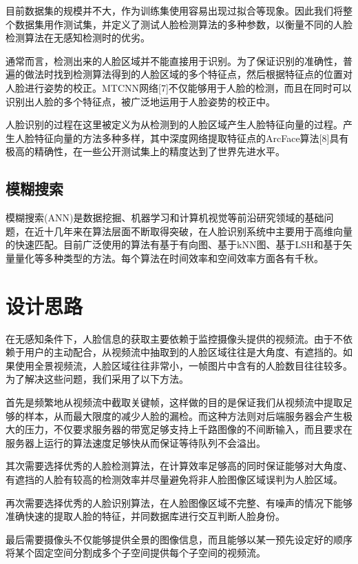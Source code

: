 目前数据集的规模并不大，作为训练集使用容易出现过拟合等现象。因此我们将整个数据集用作测试集，并定义了测试人脸检测算法的多种参数，以衡量不同的人脸检测算法在无感知检测时的优劣。

通常而言，检测出来的人脸区域并不能直接用于识别。为了保证识别的准确性，普遍的做法时找到检测算法得到的人脸区域的多个特征点，然后根据特征点的位置对人脸进行姿势的校正。MTCNN网络[7]不仅能够用于人脸的检测，而且在同时可以识别出人脸的多个特征点，被广泛地运用于人脸姿势的校正中。

人脸识别的过程在这里被定义为从检测到的人脸区域产生人脸特征向量的过程。产生人脸特征向量的方法多种多样，其中深度网络提取特征点的ArcFace算法[8]具有极高的精确性，在一些公开测试集上的精度达到了世界先进水平。

\subsection{模糊搜索}

模糊搜索(ANN)是数据挖掘、机器学习和计算机视觉等前沿研究领域的基础问题，在近十几年来在算法层面不断取得突破，在人脸识别系统中主要用于高维向量的快速匹配。目前广泛使用的算法有基于有向图、基于kNN图、基于LSH和基于矢量量化等多种类型的方法。每个算法在时间效率和空间效率方面各有千秋。

\section{设计思路}

在无感知条件下，人脸信息的获取主要依赖于监控摄像头提供的视频流。由于不依赖于用户的主动配合，从视频流中抽取到的人脸区域往往是大角度、有遮挡的。如果使用全景视频流，人脸区域往往非常小，一帧图片中含有的人脸数目往往较多。为了解决这些问题，我们采用了以下方法。

首先是频繁地从视频流中截取关键帧，这样做的目的是保证我们从视频流中提取足够的样本，从而最大限度的减少人脸的漏检。而这种方法则对后端服务器会产生极大的压力，不仅要求服务器的带宽足够支持上千路图像的不间断输入，而且要求在服务器上运行的算法速度足够快从而保证等待队列不会溢出。

其次需要选择优秀的人脸检测算法，在计算效率足够高的同时保证能够对大角度、有遮挡的人脸有较高的检测效率并尽量避免将非人脸图像区域误判为人脸区域。

再次需要选择优秀的人脸识别算法，在人脸图像区域不完整、有噪声的情况下能够准确快速的提取人脸的特征，并同数据库进行交互判断人脸身份。

最后需要摄像头不仅能够提供全景的图像信息，而且能够以某一预先设定好的顺序将某个固定空间分割成多个子空间提供每个子空间的视频流。

